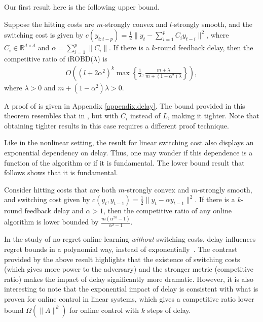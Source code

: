 Our first result here is the following upper bound.

\begin{theorem}\label{t.delay}
Suppose the hitting costs are $m$-strongly convex and $l$-strongly smooth, and the switching cost is given by $c(y_{t:t-p})=\frac{1}{2}\|y_t-\sum_{i=1}^pC_iy_{t-i}\|^2$, where $C_i\in\mathbb{R}^{d\times d}$ and $\alpha=\sum_{i=1}^p\|C_i\|$. If there is a $k$-round feedback delay, then the competitive ratio of iROBD($\lambda$) is
\begin{align}
    O\left( (l+2\alpha^2)^k\max\left\{\frac{1}{\lambda},\frac{m+\lambda}{m+(1-\alpha^2)\lambda}\right\} \right),
\end{align}
where $\lambda>0$ and $m+(1-\alpha^2)\lambda>0$.
\end{theorem}

A proof of  is given in Appendix \ref{appendix.delay}. The bound provided in this theorem resembles that in , but with $C_i$ instead of $L$, making it tighter. Note that obtaining tighter results in this case requires a different proof technique. 

Like in the nonlinear setting, the result for linear switching cost also displays an exponential dependency on delay.  Thus, one may wonder if this dependence is a function of the algorithm or if it is fundamental.  The lower bound result that follows shows that it is fundamental.  

\begin{theorem} \label{t.exp_lowerbound}
Consider hitting costs that are both $m$-strongly convex and $m$-strongly smooth, and switching cost given by $c(y_t, y_{t-1}) = \frac{1}{2}\|y_t - \alpha y_{t-1}\|^2$. If there is a $k$-round feedback delay and $\alpha > 1$, then the competitive ratio of any online algorithm is lower bounded by $\frac{m (\alpha^{2k} - 1)}{\alpha^2 - 1}$.
\end{theorem}

In the study of no-regret online learning \emph{without} switching costs, delay influences regret bounds in a polynomial way, instead of exponentially~\citep{joulani2013online,shamir2017online}.  The contrast provided by the above result highlights that the existence of switching costs (which gives more power to the adversary) and the stronger metric (competitive ratio) makes the impact of delay significantly more dramatic. However, it is also interesting to note that the exponential impact of delay is consistent with what is proven \citep{yu2020competitive} for online control in linear systems, which gives a competitive ratio lower bound $\Omega(\|A\|^k)$ for online control with $k$ steps of delay.

